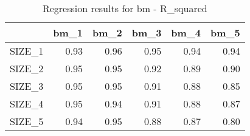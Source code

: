 \begin{table}[ht]
\centering
\caption{Regression results for bm - R_squared} 
\begin{tabular}{rrrrrr}
  \hline
 & bm\_1 & bm\_2 & bm\_3 & bm\_4 & bm\_5 \\ 
  \hline
SIZE\_1 & 0.93 & 0.96 & 0.95 & 0.94 & 0.94 \\ 
  SIZE\_2 & 0.95 & 0.95 & 0.92 & 0.89 & 0.90 \\ 
  SIZE\_3 & 0.95 & 0.95 & 0.91 & 0.88 & 0.85 \\ 
  SIZE\_4 & 0.95 & 0.94 & 0.91 & 0.88 & 0.87 \\ 
  SIZE\_5 & 0.94 & 0.95 & 0.88 & 0.87 & 0.80 \\ 
   \hline
\end{tabular}
\end{table}


